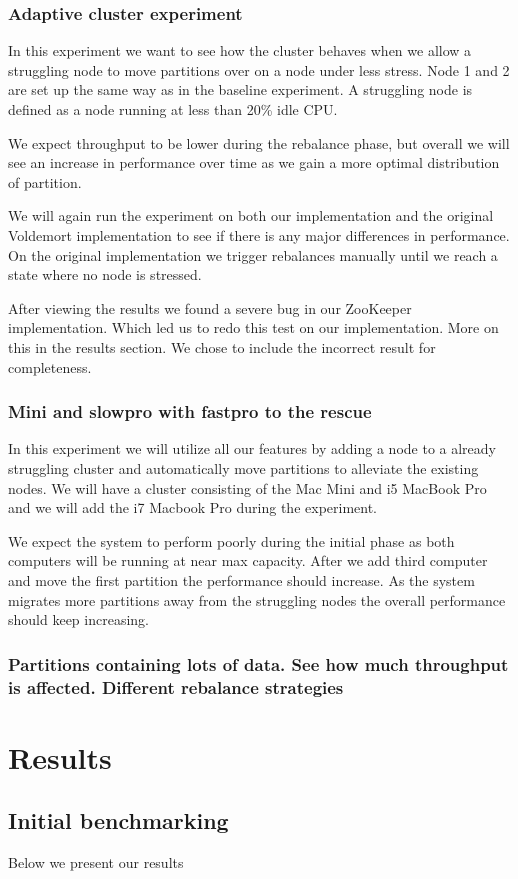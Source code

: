 \subsubsection{Adaptive cluster experiment}
In this experiment we want to see how the cluster behaves when we allow a struggling node to move partitions over on a node under less stress. Node 1 and 2 are set up the same way as in the baseline experiment. A struggling node is defined as a node running at less than 20\% idle CPU.

We expect throughput to be lower during the rebalance phase, but overall we will see an increase in performance over time as we gain a more optimal distribution of partition. 

We will again run the experiment on both our implementation and the original Voldemort implementation to see if there is any major differences in performance. On the original implementation we trigger rebalances manually until we reach a state where no node is stressed. 

After viewing the results we found a severe bug in our ZooKeeper implementation. Which led us to redo this test on our implementation. More on this in the results section. We chose to include the incorrect result for completeness. 


\subsubsection{Mini and slowpro with fastpro to the rescue}
In this experiment we will utilize all our features by adding a node to a already struggling cluster and automatically move partitions to alleviate the existing nodes. We will have a cluster consisting of the Mac Mini and i5 MacBook Pro and we will add the i7 Macbook Pro during the experiment. 

We expect the system to perform poorly during the initial phase as both computers will be running at near max capacity. After we add third computer and move the first partition the performance should increase. As the system migrates more partitions away from the struggling nodes the overall performance should keep increasing. 

\subsubsection{Partitions containing lots of data. See how much throughput is affected. Different rebalance strategies}





\section{Results}

\subsection{Initial benchmarking}
Below we present our results








